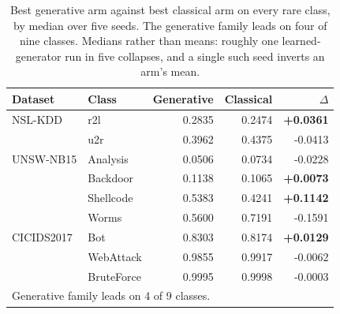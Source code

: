 \begin{table}[t]
\centering
\caption{Best generative arm against best classical arm on every rare class, by median over five seeds. The generative family leads on four of nine classes. Medians rather than means: roughly one learned-generator run in five collapses, and a single such seed inverts an arm's mean.}
\label{tab:headtohead}
\begin{tabular}{llrrr}
\toprule
Dataset & Class & Generative & Classical & $\Delta$ \\
\midrule
NSL-KDD & r2l & 0.2835 & 0.2474 & \textbf{+0.0361} \\
 & u2r & 0.3962 & 0.4375 & -0.0413 \\
\midrule
UNSW-NB15 & Analysis & 0.0506 & 0.0734 & -0.0228 \\
 & Backdoor & 0.1138 & 0.1065 & \textbf{+0.0073} \\
 & Shellcode & 0.5383 & 0.4241 & \textbf{+0.1142} \\
 & Worms & 0.5600 & 0.7191 & -0.1591 \\
\midrule
CICIDS2017 & Bot & 0.8303 & 0.8174 & \textbf{+0.0129} \\
 & WebAttack & 0.9855 & 0.9917 & -0.0062 \\
 & BruteForce & 0.9995 & 0.9998 & -0.0003 \\
\midrule
\multicolumn{5}{l}{Generative family leads on 4 of 9 classes.} \\
\bottomrule
\end{tabular}
\end{table}

